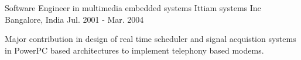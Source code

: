 \begin{cventries}
  \cventry
    {Software Engineer in multimedia embedded  systems } %
    {Ittiam systems Inc} %
    {Bangalore, India} %
    {Jul. 2001 - Mar. 2004} %
    {
      \begin{cvitems} %
       \item {Major contribution in design of real time scheduler and  signal acquistion systems in PowerPC based architectures to implement telephony based modems.}
      \end{cvitems}
    }

\end{cventries}

